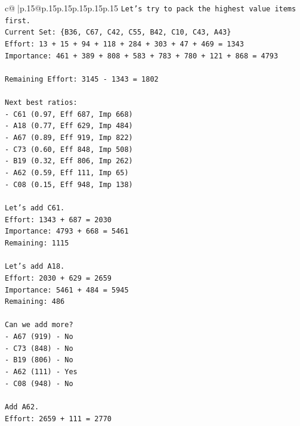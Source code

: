 \documentclass{article}
\begin{document}
{\begin{supertabular}{c@{$\;$}|p{.15\linewidth}@{}p{.15\linewidth}p{.15\linewidth}p{.15\linewidth}p{.15\linewidth}p{.15\linewidth}}
{{{\texttt{Let's try to pack the highest value items first.} \\
\texttt{Current Set: \{B36, C67, C42, C55, B42, C10, C43, A43\}} \\
\texttt{Effort: 13 + 15 + 94 + 118 + 284 + 303 + 47 + 469 = 1343} \\
\texttt{Importance: 461 + 389 + 808 + 583 + 783 + 780 + 121 + 868 = 4793} \\
\\ 
\texttt{Remaining Effort: 3145 {-} 1343 = 1802} \\
\\ 
\texttt{Next best ratios:} \\
\texttt{{-} C61 (0.97, Eff 687, Imp 668)} \\
\texttt{{-} A18 (0.77, Eff 629, Imp 484)} \\
\texttt{{-} A67 (0.89, Eff 919, Imp 822)} \\
\texttt{{-} C73 (0.60, Eff 848, Imp 508)} \\
\texttt{{-} B19 (0.32, Eff 806, Imp 262)} \\
\texttt{{-} A62 (0.59, Eff 111, Imp 65)} \\
\texttt{{-} C08 (0.15, Eff 948, Imp 138)} \\
\\ 
\texttt{Let's add C61.} \\
\texttt{Effort: 1343 + 687 = 2030} \\
\texttt{Importance: 4793 + 668 = 5461} \\
\texttt{Remaining: 1115} \\
\\ 
\texttt{Let's add A18.} \\
\texttt{Effort: 2030 + 629 = 2659} \\
\texttt{Importance: 5461 + 484 = 5945} \\
\texttt{Remaining: 486} \\
\\ 
\texttt{Can we add more?} \\
\texttt{{-} A67 (919) {-} No} \\
\texttt{{-} C73 (848) {-} No} \\
\texttt{{-} B19 (806) {-} No} \\
\texttt{{-} A62 (111) {-} Yes} \\
\texttt{{-} C08 (948) {-} No} \\
\\ 
\texttt{Add A62.} \\
\texttt{Effort: 2659 + 111 = 2770} \\
}}}
\end{supertabular}}
\end{document}
